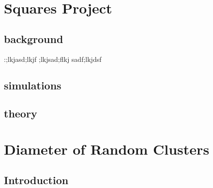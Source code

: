 \documentclass[11pt]{article}
\begin{document}
\section{Squares Project}
\label{sec-4}
\subsection{background}
\label{sec-4-1}

:;lkjasd;lkjf ;lkjsad;flkj sadf;lkjdsf
\subsection{simulations}
\label{sec-4-2}
\subsection{theory}
\label{sec-4-3}
\section{Diameter of Random Clusters}
\label{sec-5}
\subsection{Introduction}
\label{sec-5-1}
\end{document}
